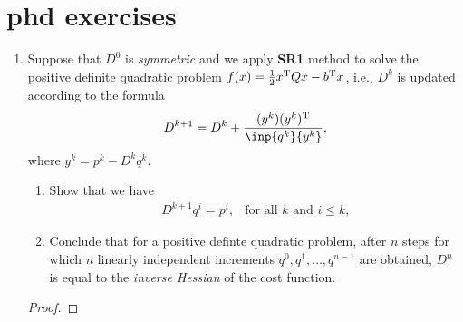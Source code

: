 \section*{phd exercises}
\begin{enumerate}
\item
Suppose that $D^0$ is \emph{symmetric} and we apply \textbf{SR1} method to solve the positive definite quadratic problem $f(x)=\frac{1}{2}x^{\mathrm T} Qx-b^{\mathrm T} x$, i.e., $D^k$ is updated according to the formula
\begin{equation}\label{Eq:7}
D^{k+1} = D^k+\frac{(y^k)(y^k)\trans}{\inp{q^k}{y^k}},
\end{equation}
where $y^k = p^k - D^kq^k$. 
\begin{enumerate}
\item
Show that we have 
\begin{equation}
\begin{array}{ll}
D^{k+1}q^i=p^i,
&
\mbox{for all $k$ and $i\le k$},
\end{array}\label{Eq:1}
\end{equation}
\item
Conclude that for a positive definte quadratic problem, after $n$ steps for which $n$ linearly independent increments $q^0,q^1,\dots,q^{n-1}$ are obtained, $D^n$ is equal to the \emph{inverse Hessian} of the cost function.
\end{enumerate}
\begin{proof}


\end{proof}
\end{enumerate}
